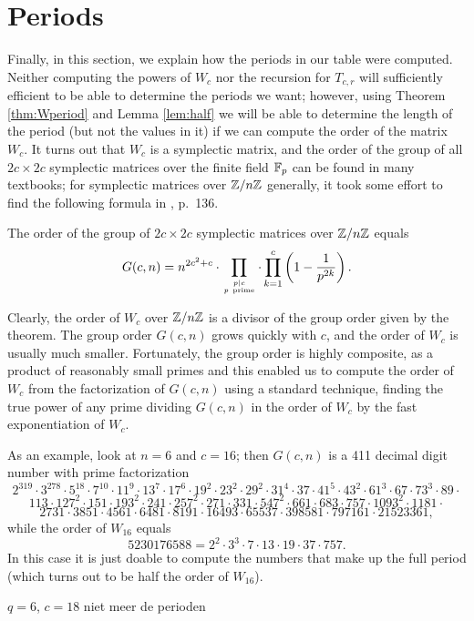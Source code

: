 \section{Periods}
Finally, in this section, we explain how the periods in our table were
computed. Neither computing the powers of $W_c$ nor the recursion for
$T_{c,r}$ will sufficiently efficient to be able to determine
the periods we want; however, using Theorem \ref{thm:Wperiod} and Lemma
\ref{lem:half} we will be able to determine the length of the period
(but not the values in it) if we can compute the order of the matrix $W_c$.
It turns out that $W_c$ is a symplectic matrix, and the order of
the group of all $2c\times 2c$ symplectic matrices over the finite field
$\mathbb F_p$ can be found in many textbooks; for symplectic matrices over
$\mathbb{Z}/n\mathbb{Z}$ generally, it took some effort to find the following
formula in \cite{newman72}, p.~136.
\begin{theorem}\label{thm:newman}
The order of the group of $2c\times 2c$ symplectic matrices over $\mathbb{Z}/n\mathbb{Z}$
equals
$$G(c,n)=n^{2c^2+c}\cdot\prod_{p\vert c\atop {p\ {\rm prime}}}\cdot\prod_{k=1}^c \left(1-\frac{1}{p^{2k}}\right).$$
\end{theorem}
Clearly, the order of $W_c$ over $\mathbb{Z}/n\mathbb{Z}$ is a divisor of the group
order given by the theorem. The group order $G(c,n)$  grows quickly with $c$,
and the order of $W_c$ is usually much smaller. Fortunately, the
group order is highly composite, as a product of reasonably small
primes and this enabled us to compute the order of $W_c$ from the
factorization of $G(c, n)$ using a standard technique, finding the true
power of any prime dividing $G(c,n)$ in the order of $W_c$ by
the fast exponentiation of $W_c$.
\begin{example}
As an example, look at $n=6$ and $c=16$; then $G(c,n)$ is a 411 decimal
digit number with prime factorization
$$2^{319} \cdot 3^{278} \cdot 5^{18} \cdot 7^{10} \cdot 11^9
 \cdot 13^7 \cdot 17^6 \cdot 19^2 \cdot 23^2 \cdot 29^2 \cdot 31^4 \cdot 37 \cdot 41^5 \cdot 43^2 \cdot 61^3 \cdot 67 \cdot 73^3 \cdot 89 \cdot$$
$$113\cdot 127^2 \cdot 151 \cdot 193^2 \cdot 241 \cdot 257^2 \cdot 271 \cdot 331 \cdot 547^2 \cdot 661 \cdot 683 \cdot 757 \cdot 1093^2 \cdot 1181 \cdot$$
$$ 2731 \cdot 3851 \cdot 4561 \cdot 6481 \cdot 8191 \cdot 16493 \cdot 65537 \cdot 398581 \cdot 797161 \cdot 21523361,$$
while the order of $W_{16}$ equals
$$5230176588=2^2 \cdot 3^3 \cdot 7 \cdot 13 \cdot 19 \cdot 37 \cdot 757.$$
In this case it is just doable to compute the numbers that make up
the full period (which turns out to be half the order of $W_{16}$).

$q=6$, $c=18$ niet meer de perioden
\end{example}

